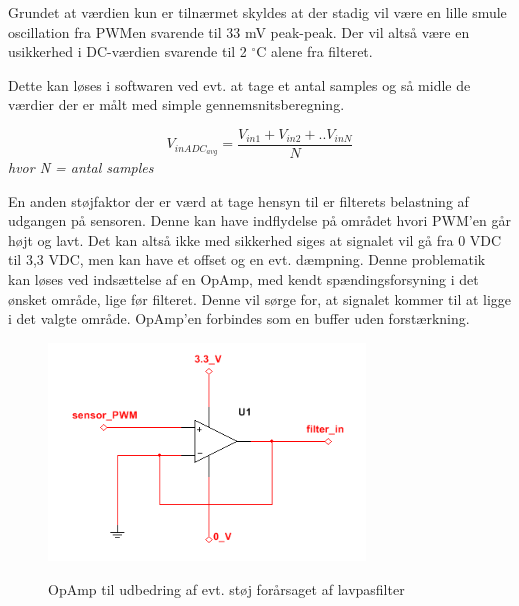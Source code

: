 Grundet at værdien kun er tilnærmet skyldes at der stadig vil være en lille smule oscillation fra PWMen svarende til 33 mV peak-peak. Der vil altså være en usikkerhed i DC-værdien svarende til 2 $^{\circ}$C alene fra filteret.

Dette kan løses i softwaren ved evt. at tage et antal samples og så midle de værdier der er målt med simple gennemsnitsberegning. 

\begin{equation}
V_{inADC_{avg}} = \frac{V_{in1} + V_{in2} + .. V_{inN}}{N}
\end{equation} 
\textit{hvor N = antal samples}

En anden støjfaktor der er værd at tage hensyn til er filterets belastning af udgangen på sensoren. Denne kan have indflydelse på området hvori PWM'en går højt og lavt. Det kan altså ikke med sikkerhed siges at signalet vil gå fra 0 VDC til 3,3 VDC, men kan have et offset og en evt. dæmpning. Denne problematik kan løses ved indsættelse af en OpAmp, med kendt spændingsforsyning i det ønsket område, lige før filteret. Denne vil sørge for, at signalet kommer til at ligge i det valgte område. OpAmp'en forbindes som en buffer uden forstærkning. 

\begin{figure}[htb]
\centering
{\includegraphics[width=0.75\textwidth]{filer/design/Billeder/sht_opamp.png}}
\caption{OpAmp til udbedring af evt. støj forårsaget af lavpasfilter}
\label{lab:sht_opamp}
\end{figure}
